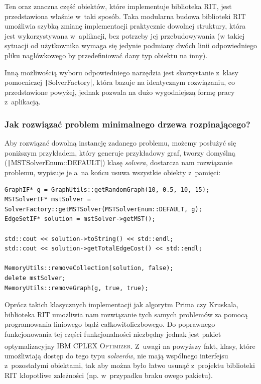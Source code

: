 Ten oraz znaczna część obiektów, które implementuje biblioteka \textsc{RIT}, jest przedstawiona właśnie w~taki sposób. Taka modularna budowa biblioteki \textsc{RIT} umożliwia szybką zmianę implementacji praktycznie dowolnej struktury, która jest wykorzystywana w~aplikacji, bez potrzeby jej przebudowywania (w takiej sytuacji od użytkownika wymaga się jedynie podmiany dwóch linii odpowiedniego pliku nagłówkowego by przedefiniować dany typ obiektu na inny).

Inną możliwością wyboru odpowiedniego narzędzia jest skorzystanie z~klasy pomocniczej \texttt|SolverFactory|, która bazuje na identycznym rozwiązaniu, co przedstawione powyżej, jednak pozwala na dużo wygodniejszą formę pracy z~aplikacją.

\subsubsection{Jak rozwiązać problem minimalnego drzewa rozpinającego?}

Aby rozwiązać dowolną instancję zadanego problemu, możemy posłużyć się poniższym przykładem, który generuje przykładowy graf, tworzy domyślną (\texttt|MSTSolverEnum::DEFAULT|) klasę \textit{solvera}, dostarcza nam rozwiązanie problemu, wypisuje je a~na końcu usuwa wszystkie obiekty z~pamięci:

\begin{verbatim}
GraphIF* g = GraphUtils::getRandomGraph(10, 0.5, 10, 15);
MSTSolverIF* mstSolver = SolverFactory::getMSTSolver(MSTSolverEnum::DEFAULT, g);
EdgeSetIF* solution = mstSolver->getMST();

std::cout << solution->toString() << std::endl;
std::cout << solution->getTotalEdgeCost() << std::endl;

MemoryUtils::removeCollection(solution, false);
delete mstSolver;
MemoryUtils::removeGraph(g, true, true);
\end{verbatim}

Oprócz takich klasycznych implementacji jak algorytm Prima czy Kruskala, biblioteka \textsc{RIT} umożliwia nam rozwiązanie tych samych problemów za pomocą programowania liniowego bądź całkowitoliczbowego. Do poprawnego funkcjonowania tej części funkcjonalności niezbędny jednak jest pakiet optymalizacyjny \textsc{IBM\textsuperscript{\textregistered} CPLEX\textsuperscript{\textregistered} Optimizer}. Z~uwagi na powyższy fakt, klasy, które umożliwiają dostęp do tego typu \textit{solverów}, nie mają wspólnego interfejsu z~pozostałymi obiektami, tak aby można było łatwo usunąć z~projektu biblioteki \textsc{RIT} kłopotliwe zależności (np. w~przypadku braku owego pakietu).


